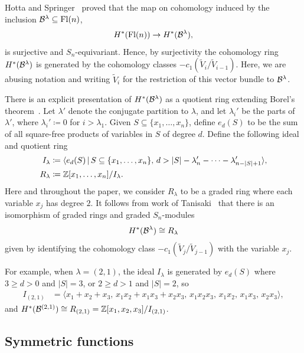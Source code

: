 \documentclass[11pt]{amsart}
\theoremstyle{definition}
\newcommand{\st}{\,|\,}
\newcommand{\Fl}{\mathrm{Fl}}
\newcommand{\la}{\lambda}
\begin{document}
Hotta and Springer~\cite{Hotta-Springer} proved that the map on cohomology induced by the inclusion $\cB^\lambda \subseteq \Fl(n)$,
\begin{align}
    H^*(\Fl(n)) \to H^*(\cB^\lambda),
\end{align}
is surjective and $S_n$-equivariant. Hence, by surjectivity the cohomology ring $H^*(\mathcal{B}^\lambda)$ is generated by the cohomology classes $-c_1(\widetilde V_i/\widetilde V_{i-1})$. Here, we are abusing notation and writing $\widetilde V_i$ for the restriction of this vector bundle to $\mathcal{B}^\lambda$. 

There is an explicit presentation of $H^*(\mathcal{B}^\lambda)$ as a quotient ring extending Borel's theorem~\cite{dCP,Tanisaki}.  Let $\la'$ denote the conjugate partition to $\la$, and let $\la_i'$ be the parts of $\la'$, where $\la_i'\coloneqq 0$ for $i>\la_1$. Given $S\subseteq \{x_1,\dots, x_n\}$, define $e_d(S)$ to be the sum of all square-free products of variables in $S$ of degree $d$. Define the following ideal and quotient ring
\begin{align}
    I_\lambda &\coloneqq \langle e_d(S) \st S\subseteq \{x_1,\dots,x_n\},\, d > |S| - \la_n' - \cdots - \la_{n-|S|+1}' \rangle,\\
    R_\lambda &\coloneqq \bZ[x_1,\dots, x_n]/I_\lambda.
\end{align}
Here and throughout the paper, we consider $R_\lambda$ to be a graded ring where each variable $x_j$ has degree $2$. It follows from work of Tanisaki~\cite{Tanisaki} that there is an isomorphism of graded rings and graded $S_n$-modules
\begin{align}
    H^*(\mathcal{B}^\lambda) \cong R_\lambda
\end{align}
given by identifying the cohomology class $-c_1(\widetilde V_j/\widetilde V_{j-1})$ with the variable $x_j$.

For example, when $\lambda = (2,1)$, the ideal $I_\lambda$ is generated by $e_d(S)$ where $3\geq d>0$ and $|S|=3$, or $2\geq d>1$ and $|S| = 2$, so 
\begin{align}
I_{(2,1)} &= \big\langle x_1+x_2+x_3,\, x_1x_2+x_1x_3+x_2x_3,\, x_1x_2x_3,\, x_1x_2,\, x_1x_3,\, x_2x_3\big\rangle,
\end{align}
and $H^*(\mathcal{B}^{(2,1)})\cong R_{(2,1)} = \mathbb{Z}[x_1,x_2,x_3]/I_{(2,1)}$.


\subsection{Symmetric functions}
\end{document}
